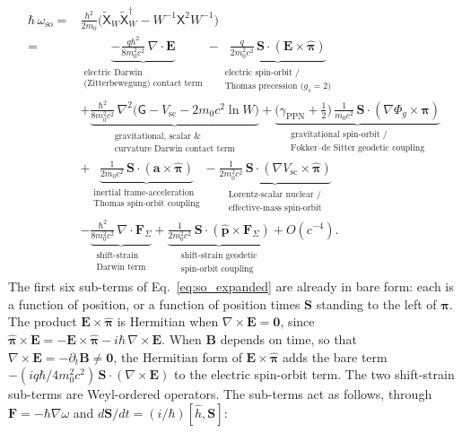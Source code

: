 \documentclass[aps,prd,onecolumn,tightenlines,nofootinbib,notitlepage,11pt,floatfix]{revtex4-2}
\theoremstyle{indentedtheorem}
\begin{document}
\begin{equation}
    \begin{aligned}
    \hbar\,\omega_\text{so} = {} &
    \frac{\hbar^2}{2m_0}\big(\tilde{\mathsf{X}}_W\tilde{\mathsf{X}}_W^\dagger-W^{-1}\mathsf{X}^2W^{-1}\big) \\
    = {} &
    \underbrace{-\frac{q\hbar^2}{8m_0^2c^2}\,\nabla\cdot\mathbf{E}}_{\substack{\text{electric Darwin} \\ \text{(Zitterbewegung) contact term}}}
    - \underbrace{\frac{q}{2m_0^2c^2}\,\mathbf{S}\cdot(\mathbf{E}\times\hat{\boldsymbol{\pi}})}_{\substack{\text{electric spin-orbit /} \\ \text{Thomas precession ($g_s=2$)}}} \\
    & + \underbrace{\frac{\hbar^2}{8m_0^2c^2}\,\nabla^2\big(\mathsf{G}-V_\text{sc}-2m_0c^2\ln W\big)}_{\substack{\text{gravitational, scalar \&} \\ \text{curvature Darwin contact term}}}
    + \underbrace{\big(\gamma_\text{PPN}+\tfrac{1}{2}\big)\,\frac{1}{m_0c^2}\,\mathbf{S}\cdot(\nabla\Phi_g\times\hat{\boldsymbol{\pi}})}_{\substack{\text{gravitational spin-orbit /} \\ \text{Fokker--de Sitter geodetic coupling}}} \\
    & + \underbrace{\frac{1}{2m_0c^2}\,\mathbf{S}\cdot(\mathbf{a}\times\hat{\boldsymbol{\pi}})}_{\substack{\text{inertial frame-acceleration} \\ \text{Thomas spin-orbit coupling}}}
    - \underbrace{\frac{1}{2m_0^2c^2}\,\mathbf{S}\cdot(\nabla V_\text{sc}\times\hat{\boldsymbol{\pi}})}_{\substack{\text{Lorentz-scalar nuclear /} \\ \text{effective-mass spin-orbit}}} \\
    & - \underbrace{\frac{\hbar^2}{8m_0^2c^2}\,\nabla\cdot\mathbf{F}_\Sigma}_{\substack{\text{shift-strain} \\ \text{Darwin term}}}
    + \underbrace{\frac{1}{2m_0^2c^2}\,\mathbf{S}\cdot(\hat{\mathbf{p}}\times\mathbf{F}_\Sigma)}_{\substack{\text{shift-strain geodetic} \\ \text{spin-orbit coupling}}} + O(c^{-4}) .
    \end{aligned}
    \label{eq:so_expanded}
\end{equation}
The first six sub-terms of Eq.~\eqref{eq:so_expanded} are already in bare form: each is a function of position, or a function of position times $\mathbf{S}$ standing to the left of $\hat{\boldsymbol{\pi}}$. The product $\mathbf{E}\times\hat{\boldsymbol{\pi}}$ is Hermitian when $\nabla\times\mathbf{E}=\mathbf{0}$, since $\hat{\boldsymbol{\pi}}\times\mathbf{E} = -\mathbf{E}\times\hat{\boldsymbol{\pi}} - i\hbar\,\nabla\times\mathbf{E}$. When $\mathbf{B}$ depends on time, so that $\nabla\times\mathbf{E}=-\partial_t\mathbf{B}\neq\mathbf{0}$, the Hermitian form of $\mathbf{E}\times\hat{\boldsymbol{\pi}}$ adds the bare term $-(iq\hbar/4m_0^2c^2)\,\mathbf{S}\cdot(\nabla\times\mathbf{E})$ to the electric spin-orbit term. The two shift-strain sub-terms are Weyl-ordered operators. The sub-terms act as follows, through $\mathbf{F}=-\hbar\nabla\omega$ and $d\mathbf{S}/dt=(i/\hbar)[\hat{h},\mathbf{S}]$:
\end{document}
